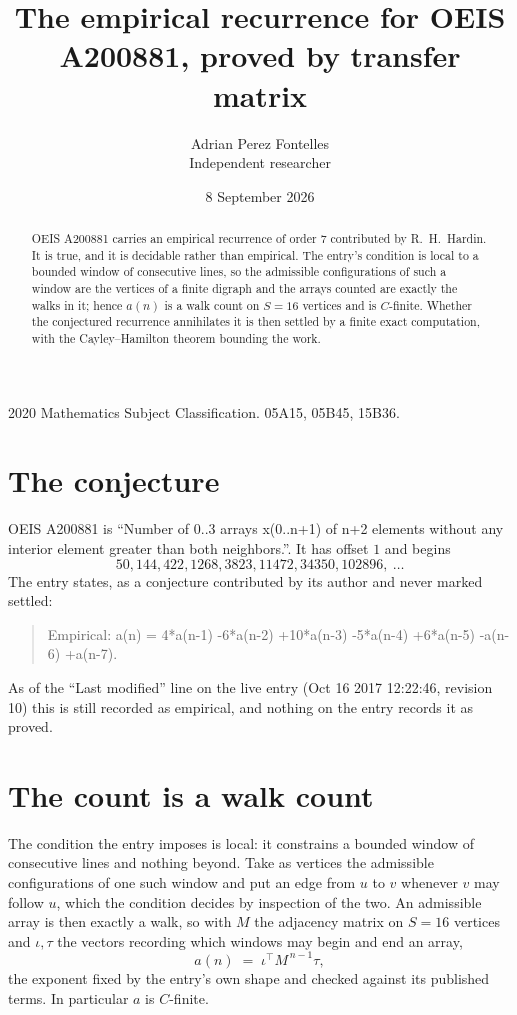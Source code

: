 \documentclass[11pt,a4paper]{article}
\title{The empirical recurrence for OEIS A200881, proved by transfer matrix}
\author{Adrian Perez Fontelles\\ \small Independent researcher}
\date{8 September 2026}
\theoremstyle{plain}
\theoremstyle{definition}
\begin{document}
\maketitle

\begin{abstract}
OEIS A200881 carries an empirical recurrence of order $7$ contributed by R.~H.~Hardin. It is
true, and it is decidable rather than empirical. The entry's condition is local to a bounded window of consecutive lines, so
the admissible configurations of such a window are the vertices of a finite digraph and the
arrays counted are exactly the walks in it; hence $a(n)$ is a walk count on $S=16$ vertices
and is $C$-finite. Whether the conjectured recurrence annihilates it is then settled by a
finite exact computation, with the Cayley--Hamilton theorem bounding the work.
\end{abstract}

\noindent\small 2020 Mathematics Subject Classification. 05A15, 05B45, 15B36.\normalsize

\section{The conjecture}

OEIS A200881 is ``Number of 0..3 arrays x(0..n+1) of n+2 elements without any interior element greater than both neighbors.''. It has offset $1$ and begins
\[
50, 144, 422, 1268, 3823, 11472, 34350, 102896,\ \dots
\]
The entry states, as a conjecture contributed by its author and never marked settled:
\begin{quote}
Empirical: a(n) = 4*a(n-1) -6*a(n-2) +10*a(n-3) -5*a(n-4) +6*a(n-5) -a(n-6) +a(n-7).
\end{quote}
As of the ``Last modified'' line on the live entry (Oct 16 2017 12:22:46, revision 10) this is still
recorded as empirical, and nothing on the entry records it as proved.

\section{The count is a walk count}

The condition the entry imposes is local: it constrains a bounded window of consecutive lines and nothing beyond. Take as
vertices the admissible configurations of one such window and put an edge from $u$ to $v$
whenever $v$ may follow $u$, which the condition decides by inspection of the two. An
admissible array is then exactly a walk, so with $M$ the adjacency matrix on $S=16$ vertices
and $\iota,\tau$ the vectors recording which windows may begin and end an array,
\[
a(n)\;=\;\iota^{\!\top}M^{\,n-1}\tau ,
\]
the exponent fixed by the entry's own shape and checked against its published terms. In
particular $a$ is $C$-finite.
\end{document}
